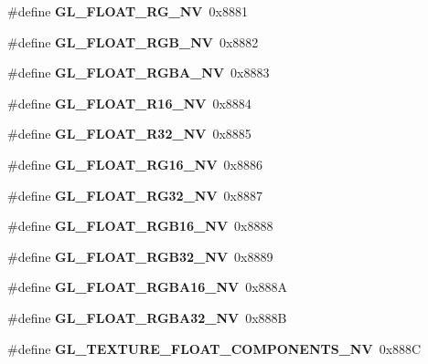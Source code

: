\begin{DoxyCompactItemize}
\item 
\#define {\bfseries G\+L\+\_\+\+F\+L\+O\+A\+T\+\_\+\+R\+G\+\_\+\+N\+V}~0x8881\label{_s_d_l__opengl_8h_af544133b3fc28eec104fa2e5e2bdef8a}

\item 
\#define {\bfseries G\+L\+\_\+\+F\+L\+O\+A\+T\+\_\+\+R\+G\+B\+\_\+\+N\+V}~0x8882\label{_s_d_l__opengl_8h_a3d47cb109295288fb9fed9ec48a95099}

\item 
\#define {\bfseries G\+L\+\_\+\+F\+L\+O\+A\+T\+\_\+\+R\+G\+B\+A\+\_\+\+N\+V}~0x8883\label{_s_d_l__opengl_8h_a0b793163fa49e8baefa8780ca156a54c}

\item 
\#define {\bfseries G\+L\+\_\+\+F\+L\+O\+A\+T\+\_\+\+R16\+\_\+\+N\+V}~0x8884\label{_s_d_l__opengl_8h_afc28347faf59afb2ef318fc617e7389d}

\item 
\#define {\bfseries G\+L\+\_\+\+F\+L\+O\+A\+T\+\_\+\+R32\+\_\+\+N\+V}~0x8885\label{_s_d_l__opengl_8h_a74e1ea14a404cc3b3accfc80371a551e}

\item 
\#define {\bfseries G\+L\+\_\+\+F\+L\+O\+A\+T\+\_\+\+R\+G16\+\_\+\+N\+V}~0x8886\label{_s_d_l__opengl_8h_a06d19ca1e5717f3be88b879eb37b03f0}

\item 
\#define {\bfseries G\+L\+\_\+\+F\+L\+O\+A\+T\+\_\+\+R\+G32\+\_\+\+N\+V}~0x8887\label{_s_d_l__opengl_8h_a42fb7f602cd23d7f26f43b2c110f54a0}

\item 
\#define {\bfseries G\+L\+\_\+\+F\+L\+O\+A\+T\+\_\+\+R\+G\+B16\+\_\+\+N\+V}~0x8888\label{_s_d_l__opengl_8h_aafa13cc0aa82c1ebe98c7900362c7e90}

\item 
\#define {\bfseries G\+L\+\_\+\+F\+L\+O\+A\+T\+\_\+\+R\+G\+B32\+\_\+\+N\+V}~0x8889\label{_s_d_l__opengl_8h_a349a351d9f755087db8471f66bb9716b}

\item 
\#define {\bfseries G\+L\+\_\+\+F\+L\+O\+A\+T\+\_\+\+R\+G\+B\+A16\+\_\+\+N\+V}~0x888\+A\label{_s_d_l__opengl_8h_a43c163fe9371f449e6d00ff2297e2aa1}

\item 
\#define {\bfseries G\+L\+\_\+\+F\+L\+O\+A\+T\+\_\+\+R\+G\+B\+A32\+\_\+\+N\+V}~0x888\+B\label{_s_d_l__opengl_8h_a945fc420f26ed5f1941022278c5ffd57}

\item 
\#define {\bfseries G\+L\+\_\+\+T\+E\+X\+T\+U\+R\+E\+\_\+\+F\+L\+O\+A\+T\+\_\+\+C\+O\+M\+P\+O\+N\+E\+N\+T\+S\+\_\+\+N\+V}~0x888\+C\label{_s_d_l__opengl_8h_a52ee33087e62bbd7a5a39cdcbcdd2dc9}


\end{DoxyCompactItemize}
